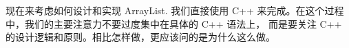 \documentclass[a4paper]{ctexart}
\theoremstyle{definition}
\theoremstyle{definition}
\begin{document}




现在来考虑如何设计和实现 ArrayList. 我们直接使用 C++ 来完成。在这个过程中，我们的主要注意力不要过度集中在具体的 C++ 语法上，
而是要关注 C++ 的设计逻辑和原则。相比怎样做，更应该问的是为什么这么做。
\end{document}
